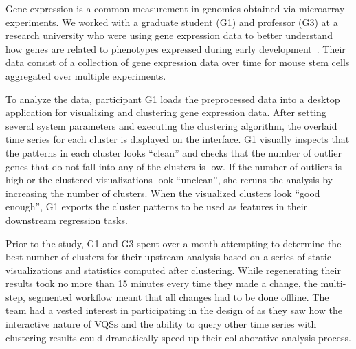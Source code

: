\par\noindent{} Gene expression is a common measurement in genomics obtained via microarray experiments.  We worked with a graduate student (G1) and professor (G3) at a research university who were using gene expression data to better understand how genes are related to phenotypes expressed during early development~\cite{Peng2016,Gloss2017}. Their data consist of a collection of gene expression data over time for mouse stem cells aggregated over multiple experiments. %
\par To analyze the data, participant G1 loads the preprocessed data into a desktop application for visualizing and clustering gene expression data. After setting several system parameters and executing the clustering algorithm, the overlaid time series for each cluster is displayed on the interface. G1 visually inspects that the patterns in each cluster looks ``clean'' and checks that the number of outlier genes that do not fall into any of the clusters is low.  If the number of outliers is high or the clustered visualizations look ``unclean'', she reruns the analysis by increasing the number of clusters. When the visualized clusters look ``good enough'', G1 exports the cluster patterns to be used as features in their downstream regression tasks.
\par Prior to the study, G1 and G3 spent over a month attempting to determine the best number of clusters for their upstream analysis based on a series of static visualizations and statistics computed after clustering. While regenerating their results took no more than 15 minutes every time they made a change, the multi-step, segmented workflow meant that all changes had to be done offline. The team had a vested interest in participating in the design of \zv as they saw how the interactive nature of VQSs and the ability to query other time series with clustering results could dramatically speed up their collaborative analysis process.
